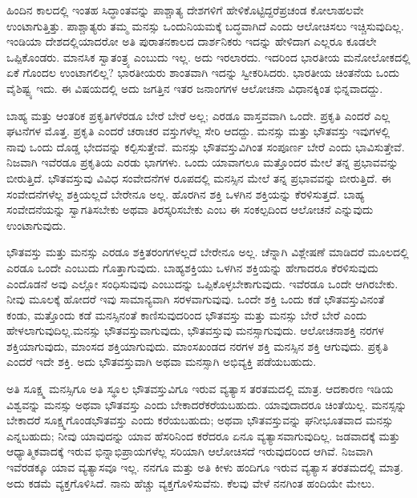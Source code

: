 ಹಿಂದಿನ ಕಾಲದಲ್ಲಿ ಇಂತಹ ಸಿದ್ಧಾಂತವನ್ನು ಪಾಶ್ಚಾತ್ಯ ದೇಶಗಳಿಗೆ ಹೇಳಿಕೊಟ್ಟಿದ್ದರೆ\break ಪ್ರಚಂಡ ಕೋಲಾಹಲವೇ ಉಂಟಾಗುತ್ತಿತ್ತು. ಪಾಶ್ಚಾತ್ಯರು ತಮ್ಮ ಮನಸ್ಸು ಒಂದು\break ನಿಯಮಕ್ಕೆ ಬದ್ಧವಾಗಿದೆ ಎಂದು ಆಲೋಚಿಸಲು ಇಚ್ಚಿಸುವುದಿಲ್ಲ. ಇಂಡಿಯಾ ದೇಶದಲ್ಲಿ\-ಯಾದರೋ ಅತಿ ಪುರಾತನಕಾಲದ ದಾರ್ಶನಿಕರು ಇದನ್ನು ಹೇಳಿದಾಗ ಎಲ್ಲರೂ ಕೂಡಲೇ ಒಪ್ಪಿಕೊಂಡರು. ಮಾನಸಿಕ ಸ್ವಾತಂತ್ರ್ಯ ಎಂಬುದು ಇಲ್ಲ. ಅದು ಇರಲಾರದು. ಇದರಿಂದ ಭಾರತೀಯ ಮನೋಲೋಕದಲ್ಲಿ ಏಕೆ ಗೊಂದಲ ಉಂಟಾಗಲಿಲ್ಲ? ಭಾರತೀಯರು ಶಾಂತವಾಗಿ ಇದನ್ನು ಸ್ವೀಕರಿಸಿದರು. ಭಾರತೀಯ ಚಿಂತನೆಯ ಒಂದು ವೈಶಿಷ್ಟ್ಯ ಇದು. ಈ ವಿಷಯದಲ್ಲಿ ಅದು ಜಗತ್ತಿನ ಇತರ ಜನಾಂಗಗಳ ಆಲೋಚನಾ ವಿಧಾನಕ್ಕಿಂತ ಭಿನ್ನವಾದದ್ದು.

ಬಾಹ್ಯ ಮತ್ತು ಆಂತರಿಕ ಪ್ರಕೃತಿಗಳೆರಡೂ ಬೇರೆ ಬೇರೆ ಅಲ್ಲ; ಎರಡೂ ವಾಸ್ತವವಾಗಿ ಒಂದೇ. ಪ್ರಕೃತಿ ಎಂದರೆ ಎಲ್ಲ ಘಟನೆಗಳ ಮೊತ್ತ. ಪ್ರಕೃತಿ ಎಂದರೆ ಚರಾಚರ ವಸ್ತುಗಳೆಲ್ಲ ಸೇರಿ ಆದದ್ದು. ಮನಸ್ಸು ಮತ್ತು ಭೌತವಸ್ತು ಇವುಗಳಲ್ಲಿ ನಾವು ಒಂದು ದೊಡ್ಡ ಭೇದವನ್ನು ಕಲ್ಪಿಸುತ್ತೇವೆ. ಮನಸ್ಸು ಭೌತವಸ್ತುವಿಗಿಂತ ಸಂಪೂರ್ಣ ಬೇರೆ ಎಂದು ಭಾವಿಸುತ್ತೇವೆ. ನಿಜವಾಗಿ ಇವೆರಡೂ ಪ್ರಕೃತಿಯ ಎರಡು ಭಾಗಗಳು. ಒಂದು ಯಾವಾಗಲೂ ಮತ್ತೊಂದರ ಮೇಲೆ ತನ್ನ ಪ್ರಭಾವವನ್ನು ಬೀರುತ್ತಿದೆ. ಭೌತವಸ್ತುವು ವಿವಿಧ ಸಂವೇದನೆಗಳ ರೂಪದಲ್ಲಿ ಮನಸ್ಸಿನ ಮೇಲೆ ತನ್ನ ಪ್ರಭಾವವನ್ನು ಬೀರುತ್ತಿದೆ. ಈ ಸಂವೇದನೆಗಳೆಲ್ಲ  ಶಕ್ತಿಯಲ್ಲದೆ ಬೇರೇನೂ ಅಲ್ಲ. ಹೊರಗಿನ ಶಕ್ತಿ ಒಳಗಿನ ಶಕ್ತಿಯನ್ನು ಕೆರಳಿಸುತ್ತದೆ. ಬಾಹ್ಯ ಸಂವೇದನೆಯನ್ನು ಸ್ವಾಗತಿಸಬೇಕು ಅಥವಾ ತಿರಸ್ಕರಿಸಬೇಕು ಎಂಬ ಈ ಸಂಕಲ್ಪದಿಂದ ಆಲೋಚನೆ ಎನ್ನುವುದು ಉಂಟಾಗುವುದು.

\eject

ಭೌತವಸ್ತು ಮತ್ತು ಮನಸ್ಸು ಎರಡೂ ಶಕ್ತಿತರಂಗಗಳಲ್ಲದೆ ಬೇರೇನೂ ಅಲ್ಲ. ಚೆನ್ನಾಗಿ ವಿಶ್ಲೇಷಣೆ ಮಾಡಿದರೆ ಮೂಲದಲ್ಲಿ ಎರಡೂ ಒಂದೇ ಎಂಬುದು ಗೊತ್ತಾಗುವುದು. ಬಾಹ್ಯಶಕ್ತಿಯು ಒಳಗಿನ ಶಕ್ತಿಯನ್ನು ಹೇಗಾದರೂ ಕೆರಳಿಸುವುದು ಎಂದೊಡನೆ ಅವು ಎಲ್ಲೋ ಸಂಧಿಸುವುವು ಎಂಬುದನ್ನು ಒಪ್ಪಿಕೊಳ್ಳಬೇಕಾಗುವುದು. ಇವೆರಡೂ ಒಂದೇ ಆಗಿರಬೇಕು. ನೀವು ಮೂಲಕ್ಕೆ ಹೋದರೆ ಇವು ಸಾಮಾನ್ಯವಾಗಿ ಸರಳವಾಗುವುವು. ಒಂದೇ ಶಕ್ತಿ ಒಂದು ಕಡೆ ಭೌತವಸ್ತುವಿನಂತೆ ಕಂಡು, ಮತ್ತೊಂದು ಕಡೆ ಮನಸ್ಸಿನಂತೆ ಕಾಣಿಸುವುದರಿಂದ ಭೌತವಸ್ತು ಮತ್ತು ಮನಸ್ಸು ಬೇರೆ ಬೇರೆ ಎಂದು ಹೇಳಲಾಗುವುದಿಲ್ಲ.\break ಮನಸ್ಸು ಭೌತವಸ್ತುವಾಗುವುದು, ಭೌತವಸ್ತುವು ಮನಸ್ಸಾಗುವುದು. ಆಲೋಚನಾಶಕ್ತಿ ನರಗಳ ಶಕ್ತಿಯಾಗುವುದು, ಮಾಂಸದ ಶಕ್ತಿಯಾಗುವುದು. ಮಾಂಸಖಂಡದ ನರಗಳ ಶಕ್ತಿ ಮನಸ್ಸಿನ ಶಕ್ತಿ ಆಗುವುದು. ಪ್ರಕೃತಿ ಎಂದರೆ ಇದೇ ಶಕ್ತಿ. ಅದು ಭೌತವಸ್ತುವಾಗಿ ಅಥವಾ ಮನಸ್ಸಾಗಿ ಅಭಿವ್ಯಕ್ತಿ ಪಡೆಯಬಹುದು.

ಅತಿ ಸೂಕ್ಷ್ಮ ಮನಸ್ಸಿಗೂ ಅತಿ ಸ್ಥೂಲ ಭೌತವಸ್ತುವಿಗೂ ಇರುವ ವ್ಯತ್ಯಾಸ ತರತಮದಲ್ಲಿ ಮಾತ್ರ. ಆದಕಾರಣ ಇಡಿಯ ವಿಶ್ವವನ್ನು ಮನಸ್ಸು ಅಥವಾ ಭೌತವಸ್ತು ಎಂದು ಬೇಕಾದರೆ\break ಕರೆಯಬಹುದು. ಯಾವುದಾದರೂ ಚಿಂತೆಯಿಲ್ಲ. ಮನಸ್ಸನ್ನು ಬೇಕಾದರೆ ಸೂಕ್ಷ್ಮಗೊಂಡ\break ಭೌತವಸ್ತು ಎಂದು ಕರೆಯಬಹುದು; ಅಥವಾ ಭೌತವಸ್ತುವನ್ನು ಘನೀಭೂತವಾದ ಮನಸ್ಸು ಎನ್ನಬಹುದು; ನೀವು ಯಾವುದನ್ನು ಯಾವ ಹೆಸರಿನಿಂದ ಕರೆದರೂ ಏನೂ ವ್ಯತ್ಯಾಸವಾಗು\-ವುದಿಲ್ಲ. ಜಡವಾದಕ್ಕೆ ಮತ್ತು ಆಧ್ಯಾತ್ಮಿಕವಾದಕ್ಕೆ ಇರುವ ಭಿನ್ನಾಭಿಪ್ರಾಯಗಳೆಲ್ಲ ಸರಿಯಾಗಿ ಆಲೋಚಿಸದೆ ಇರುವುದರಿಂದ ಆಗಿವೆ. ನಿಜವಾಗಿ ಇವೆರಡಕ್ಕೂ ಯಾವ ವ್ಯತ್ಯಾಸವೂ ಇಲ್ಲ. ನನಗೂ ಮತ್ತು ಅತಿ ಕೀಳು ಹಂದಿಗೂ ಇರುವ ವ್ಯತ್ಯಾಸ ತರತಮದಲ್ಲಿ ಮಾತ್ರ. ಅದು ಕಡಮೆ ವ್ಯಕ್ತಗೊಳಿಸಿದೆ. ನಾನು ಹೆಚ್ಚು ವ್ಯಕ್ತಗೊಳಿಸುವೆನು. ಕೆಲವು ವೇಳೆ ನನಗಿಂತ ಹಂದಿಯೇ ಮೇಲು.

